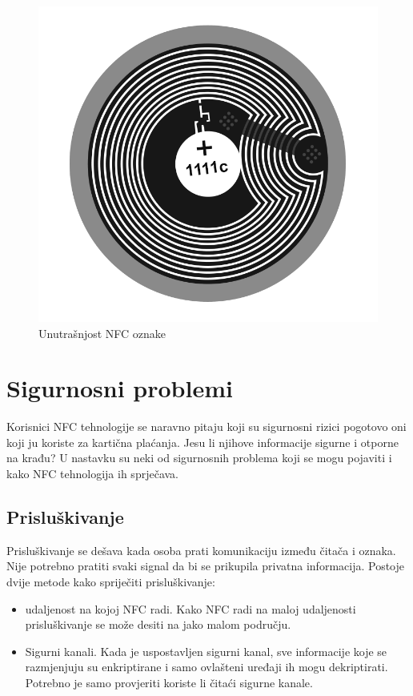 \documentclass[times, utf8, zavrsni]{fer}
\begin{document}
\begin{figure}[h]
\includegraphics[scale=0.2]{nfctag.png}
\centering
\caption{Unutrašnjost NFC oznake}
\centering
\end{figure}

\section{Sigurnosni problemi}
Korisnici NFC tehnologije se naravno pitaju koji su sigurnosni rizici pogotovo oni koji ju koriste za kartična plaćanja. Jesu li njihove informacije sigurne i otporne na krađu? U nastavku su neki od sigurnosnih problema koji se mogu pojaviti i kako NFC tehnologija ih sprječava.
\subsection{Prisluškivanje}
Prisluškivanje se dešava kada osoba prati komunikaciju između čitača i oznaka. Nije potrebno pratiti svaki signal da bi se prikupila privatna informacija. Postoje dvije metode kako spriječiti prisluškivanje:
\begin{itemize}
\item udaljenost na kojoj NFC radi. Kako NFC radi na maloj udaljenosti prisluškivanje se može desiti na jako malom području.
\item Sigurni kanali. Kada je uspostavljen sigurni kanal, sve informacije koje se razmjenjuju su enkriptirane i samo ovlašteni uređaji ih mogu dekriptirati. Potrebno je samo provjeriti koriste li čitaći sigurne kanale.
\end{itemize}
\end{document}
